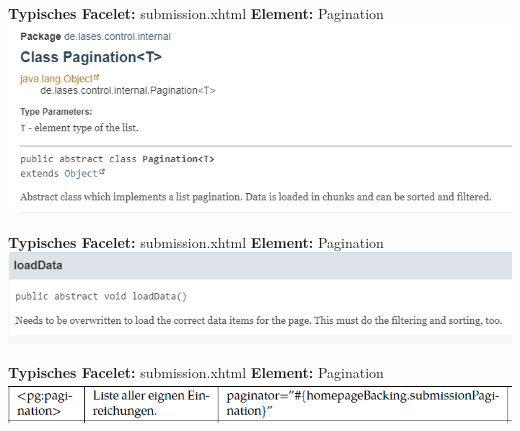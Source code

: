 \documentclass{beamer}
\begin{document}
    \begin{frame}{\textbf{Typisches Facelet:} submission.xhtml}
        \textbf{Element:} Pagination
        \newline\newline
        \centering
        \includegraphics[height=0.5\textheight]{graphics/facelet/pagination/doc_pag}
    \end{frame}
    \begin{frame}{\textbf{Typisches Facelet:} submission.xhtml}
        \textbf{Element:} Pagination
        \newline\newline
        \centering
        \includegraphics[height=0.2\textheight]{graphics/facelet/pagination/doc_loaddata}
    \end{frame}
    \begin{frame}{\textbf{Typisches Facelet:} submission.xhtml}
        \textbf{Element:} Pagination
        \newline\newline
        \centering
        \includegraphics[height=0.1\textheight]{graphics/facelet/pagination/fac_pag}
    \end{frame}
\end{document}
